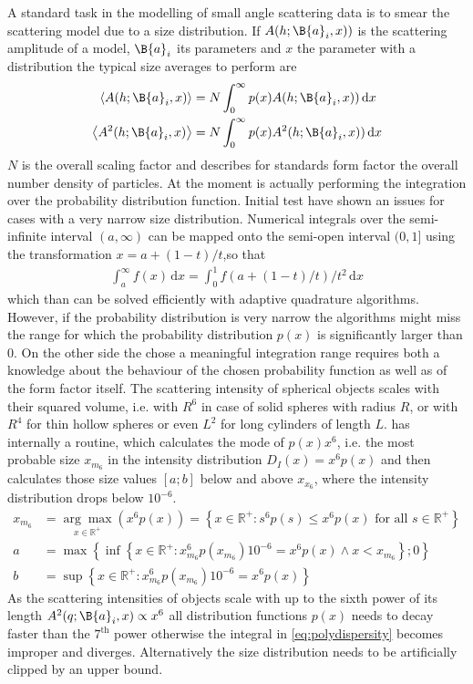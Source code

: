 A standard task in the modelling of small angle scattering data is to smear the scattering model due to a size distribution.
If $A(h;\B{a}_i,x))$ is the scattering amplitude of a model, $\B{a}_i$ its parameters and $x$ the parameter with a distribution the typical size averages to perform are
\begin{align}\label{eq:avgSAS}
  \left\langle A(h;\B{a}_i,x)\right\rangle & = N \int_0^\infty p(x) A(h;\B{a}_i,x))\, \mathrm{d}x \\
  \left\langle A^2(h;\B{a}_i,x)\right\rangle & = N \int_0^\infty p(x) A^2(h;\B{a}_i,x))\, \mathrm{d}x  \label{eq:polydispersity}
\end{align}
$N$ is the overall scaling factor and describes for standards form factor the overall number density of particles. At the moment \SASfit is actually performing the integration over the probability distribution function. Initial test have shown an issues for cases with a very narrow size distribution. Numerical integrals over the semi-infinite interval $(a,\infty)$ can be mapped onto the semi-open interval $(0,1]$ using the transformation $x = a + (1-t)/t$,so that
\begin{align}
\int_{a}^{\infty}  f(x) \, \mathrm{d}x= \int_0^1  f(a + (1-t)/t)/t^2 \, \mathrm{d}x
\end{align}
which than can be solved efficiently with adaptive quadrature algorithms. However, if the probability distribution is very narrow the algorithms might miss the range for which the probability distribution $p(x)$ is significantly larger than 0.
On the other side the chose a meaningful integration range requires both a knowledge about the behaviour of the chosen probability function as well as of the form factor itself. The scattering intensity of spherical objects scales with their squared volume, i.e. with $R^6$ in case of solid spheres with radius $R$, or with $R^4$ for thin hollow spheres or even $L^2$ for long cylinders of length $L$. \SASfit has internally a routine, which calculates the mode of $p(x)x^6$, i.e. the most probable size $x_{m_6}$ in the intensity distribution $D_I(x)=x^6 p(x)$ and then calculates those size values $[a;b]$ below and above $x_{x_6}$, where the intensity distribution drops below $10^{-6}$.
\begin{align}\label{eq:findintegrationrange}
x_{m_6} &= \underset{x\in \mathbb{R}^+}{\arg\max} \left(x^6p(x)\right)=\left\{x\in\mathbb{R}^+: s^6 p(s) \leq x^6 p(x) \mbox{ for all } s\in \mathbb{R}^+\right\} \\
  a &= \max\left\{\inf\left\{x\in \mathbb{R}^+:x_{m_6}^6 p(x_{m_6})10^{-6}=x^6 p(x) \wedge x<x_{m_6}\right\};0\right\}\\
  b &= \sup\left\{x\in \mathbb{R}^+:x_{m_6}^6 p(x_{m_6})10^{-6}=x^6 p(x)\right\}
\end{align}
As the scattering intensities of objects scale with up to the sixth power of its length $A^2(q;\B{a}_i,x) \propto x^6$ all distribution functions $p(x)$ needs to decay faster than the $7^\mathrm{th}$ power otherwise the integral in \ref{eq:polydispersity} becomes improper and diverges. Alternatively the size distribution needs to be artificially clipped by an upper bound.

